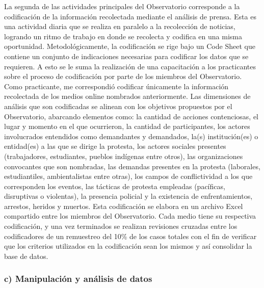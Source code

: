 \documentclass[
  12pt,
]{article}
\begin{document}
\doublespacing

La segunda de las actividades principales del Observatorio corresponde a
la codificación de la información recolectada mediante el análisis de
prensa. Esta es una actividad diaria que se realiza en paralelo a la
recolección de noticias, logrando un ritmo de trabajo en donde se
recolecta y codifica en una misma oportunidad. Metodológicamente, la
codificación se rige bajo un Code Sheet que contiene un conjunto de
indicaciones necesarias para codificar los datos que se requieren. A
esto se le suma la realización de una capacitación a los practicantes
sobre el proceso de codificación por parte de los miembros del
Observatorio. Como practicante, me correspondió codificar únicamente la
información recolectada de los medios online nombrados anteriormente.
Las dimensiones de análisis que son codificadas se alinean con los
objetivos propuestos por el Observatorio, abarcando elementos como: la
cantidad de acciones contenciosas, el lugar y momento en el que
ocurrieron, la cantidad de participantes, los actores involucrados
entendidos como demandantes y demandados, la(s) institución(es) o
entidad(es) a las que se dirige la protesta, los actores sociales
presentes (trabajadores, estudiantes, pueblos indígenas entre otros),
las organizaciones convocantes que son nombradas, las demandas presentes
en la protesta (laborales, estudiantiles, ambientalistas entre otras),
los campos de conflictividad a los que corresponden los eventos, las
tácticas de protesta empleadas (pacíficas, disruptivas o violentas), la
presencia policial y la existencia de enfrentamientos, arrestos, heridos
y muertos. Esta codificación se elabora en un archivo Excel compartido
entre los miembros del Observatorio. Cada medio tiene su respectiva
codificación, y una vez terminados se realizan revisiones cruzadas entre
los codificadores de un remuestreo del 10\% de los casos totales con el
fin de verificar que los criterios utilizados en la codificación sean
los mismos y así consolidar la base de datos.

\hypertarget{c-manipulaciuxf3n-y-anuxe1lisis-de-datos}{%
\subsubsection{c) Manipulación y análisis de
datos}\label{c-manipulaciuxf3n-y-anuxe1lisis-de-datos}}

\doublespacing
\end{document}
